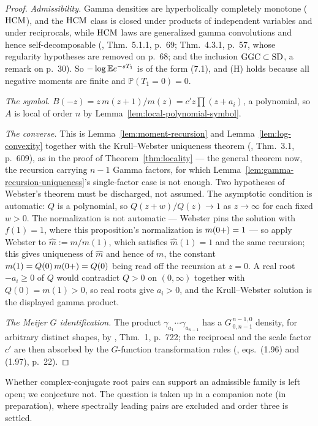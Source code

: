 \begin{proof}
\emph{Admissibility.} Gamma densities are hyperbolically completely monotone ($\mathrm{HCM}$), and
the $\mathrm{HCM}$ class is closed under products of independent variables and under reciprocals,
while $\mathrm{HCM}$ laws are generalized gamma convolutions and hence self-decomposable
(, Thm.~5.1.1, p.~69; Thm.~4.3.1, p.~57, whose regularity
hypotheses are removed on p.~68; and the inclusion $\mathrm{GGC} \subset \mathrm{SD}$, a remark on
p.~30). So $-\log \mathbb{E} e^{-sT_1}$ is of the form (7.1), and (H) holds
because all negative moments are finite and $\mathbb{P}(T_1 = 0) = 0$.

\emph{The symbol.} $B(-z) = z\,m(z+1)/m(z) = c'z\prod(z+a_i)$, a polynomial, so $A$ is local
of order $n$ by Lemma~\ref{lem:local-polynomial-symbol}.

\emph{The converse.} This is Lemma~\ref{lem:moment-recursion} and
Lemma~\ref{lem:log-convexity} together with the Krull--Webster uniqueness theorem
(, Thm.~3.1, p.~609), as in the proof of Theorem~\ref{thm:locality} ---
the general theorem now, the recursion carrying $n-1$ Gamma factors, for which
Lemma~\ref{lem:gamma-recursion-uniqueness}'s single-factor case is not enough. Two hypotheses
of Webster's theorem must be discharged, not assumed. The asymptotic condition is automatic:
$Q$ is a polynomial, so $Q(z+w)/Q(z) \to 1$ as $z \to \infty$ for each fixed $w > 0$. The
normalization is not automatic --- Webster pins the solution with $f(1) = 1$, where this
proposition's normalization is $m(0{+}) = 1$ --- so apply Webster to $\hat m := m/m(1)$, which
satisfies $\hat m(1) = 1$ and the same recursion; this gives uniqueness of $\hat m$ and hence
of $m$, the constant $m(1) = Q(0)\,m(0{+}) = Q(0)$ being read off the recursion at $z = 0$. A
real root $-a_i \ge 0$ of $Q$ would contradict $Q > 0$ on $(0,\infty)$ together with
$Q(0) = m(1) > 0$, so real roots give $a_i > 0$, and the Krull--Webster solution is the
displayed gamma product.

\emph{The Meijer $G$ identification.} The product $\gamma_{a_1}\cdots\gamma_{a_{n-1}}$ has a
$G^{\,n-1,0}_{\,0,n-1}$ density, for arbitrary distinct shapes, by
, Thm.~1, p.~722; the reciprocal and the scale factor $c'$
are then absorbed by the $G$-function transformation rules (,
eqs.~(1.96) and (1.97), p.~22).
\end{proof}

\begin{remark}\label{rem:complex-roots}
Whether complex-conjugate root pairs can support an admissible family is left open; we
conjecture not. The question is taken up in a companion note (in preparation), where
spectrally leading pairs are excluded and order three is settled.
\end{remark}

